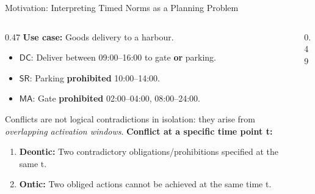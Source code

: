 \documentclass[9pt,aspectratio=169]{beamer}
\newcommand{\DC}{\ensuremath{\mathsf{DC}}\xspace}
\newcommand{\SR}{\ensuremath{\mathsf{SR}}\xspace}
\newcommand{\MA}{\ensuremath{\mathsf{MA}}\xspace}
\begin{document}




\begin{frame}{Motivation: Interpreting Timed Norms as a Planning Problem}
\begin{columns}[T]
  \begin{column}{0.47\textwidth}
    \small
    \textbf{Use case:} Goods delivery to a harbour.

    \begin{itemize}
      \item \DC: Deliver between 09:00--16:00 to gate \textbf{or} parking.
      \item \SR: Parking \textbf{prohibited} 10:00--14:00.
      \item \MA: Gate \textbf{prohibited} 02:00--04:00, 08:00--24:00.
    \end{itemize}


    Conflicts are not logical contradictions in isolation: they arise from \emph{overlapping activation windows}.
    \textbf{Conflict at a specific time point t:}
    \vspace{-2mm}
    \begin{enumerate}
      \item \textcolor{ConflictRed}{\textbf{Deontic:}} Two contradictory obligations/prohibitions specified at the same t.
      \item \textcolor{blue!50!red}{\textbf{Ontic:}} Two obliged actions cannot be achieved at the same time t.
    \end{enumerate}

   
  \end{column}
  \begin{column}{0.49\textwidth}
    \centering
\end{column}
\end{columns}
\end{frame}
\end{document}
